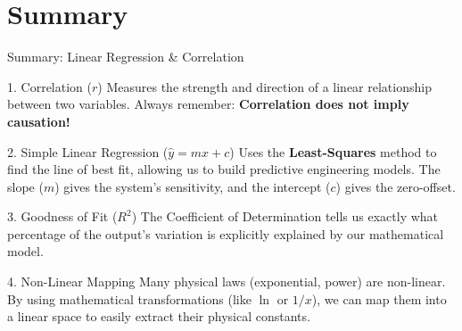 \section{Summary}
\begin{frame}{Summary: Linear Regression \& Correlation}
    \begin{block}{1. Correlation ($r$)}
        Measures the strength and direction of a linear relationship between two variables. Always remember: \textbf{Correlation does not imply causation!}
    \end{block}

    \begin{block}{2. Simple Linear Regression ($\hat{y} = mx + c$)}
        Uses the \textbf{Least-Squares} method to find the line of best fit, allowing us to build predictive engineering models. The slope ($m$) gives the system's sensitivity, and the intercept ($c$) gives the zero-offset.
    \end{block}

    \begin{block}{3. Goodness of Fit ($R^2$)}
        The Coefficient of Determination tells us exactly what percentage of the output's variation is explicitly explained by our mathematical model.
    \end{block}

    \begin{block}{4. Non-Linear Mapping}
        Many physical laws (exponential, power) are non-linear. By using mathematical transformations (like $\ln$ or $1/x$), we can map them into a linear space to easily extract their physical constants.
    \end{block}
\end{frame}



